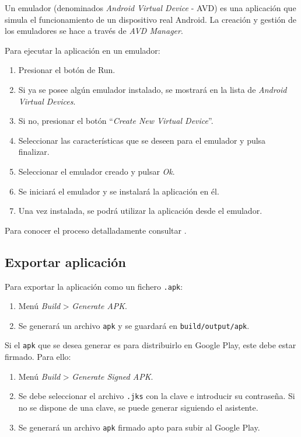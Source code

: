 Un emulador (denominados \emph{Android Virtual Device} - AVD) es una
aplicación que simula el funcionamiento de un dispositivo real Android.
La creación y gestión de los emuladores se hace a través de \emph{AVD
Manager}.

Para ejecutar la aplicación en un emulador:

\begin{enumerate}
\def\labelenumi{\arabic{enumi}.}
\tightlist
\item
  Presionar el botón de Run.
\item
  Si ya se posee algún emulador instalado, se mostrará en la lista de
  \emph{Android Virtual Devices}.
\item
  Si no, presionar el botón ``\emph{Create New Virtual Device}''.
\item
  Seleccionar las características que se deseen para el emulador y pulsa
  finalizar.
\item
  Seleccionar el emulador creado y pulsar \emph{Ok}.
\item
  Se iniciará el emulador y se instalará la aplicación en él.
\item
  Una vez instalada, se podrá utilizar la aplicación desde el emulador.
\end{enumerate}

Para conocer el proceso detalladamente consultar
\citep{android:compilerun}.

\subsection{Exportar aplicación}\label{exportar-aplicaciuxf3n}

Para exportar la aplicación como un fichero \texttt{.apk}:

\begin{enumerate}
\def\labelenumi{\arabic{enumi}.}
\tightlist
\item
  Menú \emph{Build} \textgreater{} \emph{Generate APK}.
\item
  Se generará un archivo \texttt{apk} y se guardará en
  \texttt{build/output/apk}.
\end{enumerate}

Si el \texttt{apk} que se desea generar es para distribuirlo en Google
Play, este debe estar firmado. Para ello:

\begin{enumerate}
\def\labelenumi{\arabic{enumi}.}
\tightlist
\item
  Menú \emph{Build} \textgreater{} \emph{Generate Signed APK}.
\item
  Se debe seleccionar el archivo \texttt{.jks} con la clave e introducir
  su contraseña. Si no se dispone de una clave, se puede generar
  siguiendo el asistente.
\item
  Se generará un archivo \texttt{apk} firmado apto para subir al Google
  Play.
\end{enumerate}

